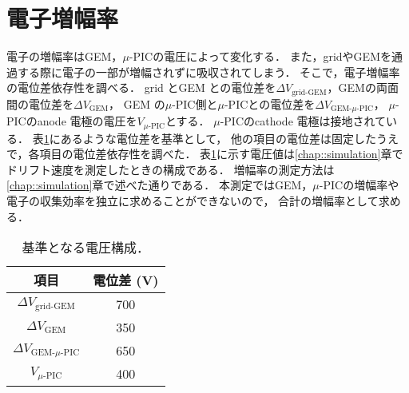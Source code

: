 \documentclass[../master]{subfiles}
\begin{document}
\section{電子増幅率}
電子の増幅率はGEM，$\mu$-PICの電圧によって変化する．
また，gridやGEMを通過する際に電子の一部が増幅されずに吸収されてしまう．
そこで，電子増幅率の電位差依存性を調べる．
grid とGEM との電位差を$\Delta V_{\text{grid-GEM}}$，GEMの両面間の電位差を$\Delta V_{\text{GEM}}$，
GEM の$\mu$-PIC側と$\mu$-PICとの電位差を$\Delta V_{\text{GEM-}\mu\text{-PIC}}$，
$\mu$-PICのanode 電極の電圧を$V_{\mu\text{-PIC}}$とする．
$\mu$-PICのcathode 電極は接地されている．
表\ref{tab::voltage_configuration}にあるような電位差を基準として，
他の項目の電位差は固定したうえで，各項目の電位差依存性を調べた．
表\ref{tab::voltage_configuration}に示す電圧値は\ref{chap::simulation}章でドリフト速度を測定したときの構成である．
増幅率の測定方法は\ref{chap::simulation}章で述べた通りである．
本測定ではGEM，$\mu$-PICの増幅率や電子の収集効率を独立に求めることができないので，
合計の増幅率として求める．
\begin{table}
  \centering
  \caption{基準となる電圧構成．}
  \label{tab::voltage_configuration}
%  
  \begin{tabular}{cc}
    \toprule
    項目 & 電位差 (\si{\volt}) \\
    \midrule
    $\Delta V_{\text{grid-GEM}}$ & 700 \\
    $\Delta V_{\text{GEM}}$ & 350 \\
    $\Delta V_{\text{GEM-}\mu\text{-PIC}}$ & 650 \\
    $V_{\mu\text{-PIC}}$ & 400 \\
    \bottomrule
  \end{tabular}
\end{table}

\end{document}
